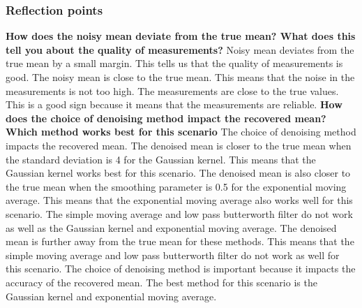 \documentclass[a4paper,12pt]{article} %
\begin{document}
\subsubsection{Reflection points}
\textbf{How does the noisy mean deviate from the true mean? What does this tell you
about the quality of measurements?}
Noisy mean deviates from the true mean by a small margin. This tells us that the quality of measurements is good. The noisy mean is close to the true mean. This means that the noise in the measurements is not too high. The measurements are close to the true values. This is a good sign because it means that the measurements are reliable. 
\newline\newline
\textbf{How does the choice of denoising method impact the recovered mean? Which
method works best for this scenario}
The choice of denoising method impacts the recovered mean. The denoised mean is closer to the true mean when the standard deviation is 4 for the Gaussian kernel. This means that the Gaussian kernel works best for this scenario. The denoised mean is also closer to the true mean when the smoothing parameter is 0.5 for the exponential moving average. This means that the exponential moving average also works well for this scenario. The simple moving average and low pass butterworth filter do not work as well as the Gaussian kernel and exponential moving average. The denoised mean is further away from the true mean for these methods. This means that the simple moving average and low pass butterworth filter do not work as well for this scenario. The choice of denoising method is important because it impacts the accuracy of the recovered mean. The best method for this scenario is the Gaussian kernel and exponential moving average.
\end{document}
